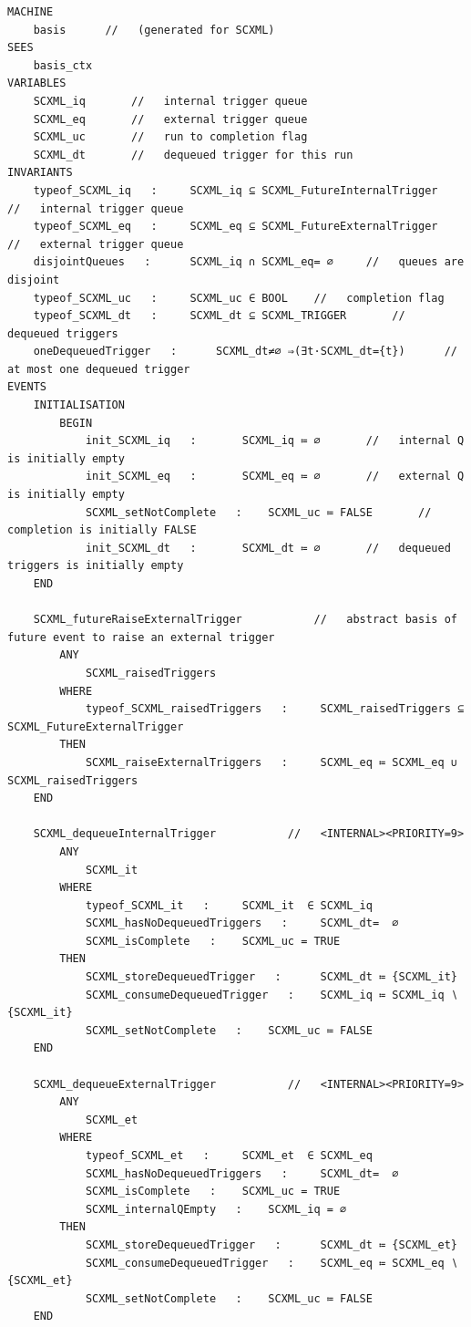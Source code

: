 \begin{lstfloat}[!tb]
\begin{lstlisting}[caption={Abstract basis machine (part of)}, label={lst:BasisMachine},language=Event-B, escapechar=|, frame=single, basicstyle=\rmfamily\scriptsize, belowskip=-2.0 \baselineskip]
MACHINE
	basis	   //   (generated for SCXML)
SEES
	basis_ctx
VARIABLES
	SCXML_iq	   //   internal trigger queue
	SCXML_eq	   //   external trigger queue
	SCXML_uc	   //   run to completion flag
	SCXML_dt	   //   dequeued trigger for this run
INVARIANTS
	typeof_SCXML_iq   :   	SCXML_iq ⊆ SCXML_FutureInternalTrigger	   //   internal trigger queue
	typeof_SCXML_eq   :   	SCXML_eq ⊆ SCXML_FutureExternalTrigger	   //   external trigger queue
	disjointQueues   :   	SCXML_iq ∩ SCXML_eq= ∅	   //   queues are disjoint
	typeof_SCXML_uc   :   	SCXML_uc ∈ BOOL	   //   completion flag
	typeof_SCXML_dt   :   	SCXML_dt ⊆ SCXML_TRIGGER	   //   dequeued triggers
	oneDequeuedTrigger   :   	SCXML_dt≠∅ ⇒(∃t·SCXML_dt={t})	   //   at most one dequeued trigger
EVENTS
	INITIALISATION      
		BEGIN
			init_SCXML_iq   :   	SCXML_iq ≔ ∅	   //   internal Q is initially empty
			init_SCXML_eq   :   	SCXML_eq ≔ ∅	   //   external Q is initially empty
			SCXML_setNotComplete   :   	SCXML_uc ≔ FALSE	   //   completion is initially FALSE
			init_SCXML_dt   :   	SCXML_dt ≔ ∅	   //   dequeued triggers is initially empty
	END

	SCXML_futureRaiseExternalTrigger      	   //   abstract basis of future event to raise an external trigger
		ANY
			SCXML_raisedTriggers
		WHERE
			typeof_SCXML_raisedTriggers   :   	SCXML_raisedTriggers ⊆ SCXML_FutureExternalTrigger
		THEN
			SCXML_raiseExternalTriggers   :   	SCXML_eq ≔ SCXML_eq ∪ SCXML_raisedTriggers
	END

	SCXML_dequeueInternalTrigger      	   //   <INTERNAL><PRIORITY=9>
		ANY
			SCXML_it
		WHERE
			typeof_SCXML_it   :   	SCXML_it  ∈ SCXML_iq
			SCXML_hasNoDequeuedTriggers   :   	SCXML_dt=  ∅
			SCXML_isComplete   :   	SCXML_uc = TRUE
		THEN
			SCXML_storeDequeuedTrigger   :   	SCXML_dt ≔ {SCXML_it}
			SCXML_consumeDequeuedTrigger   :   	SCXML_iq ≔ SCXML_iq ∖ {SCXML_it}
			SCXML_setNotComplete   :   	SCXML_uc ≔ FALSE
	END

	SCXML_dequeueExternalTrigger      	   //   <INTERNAL><PRIORITY=9>
		ANY
			SCXML_et
		WHERE
			typeof_SCXML_et   :   	SCXML_et  ∈ SCXML_eq
			SCXML_hasNoDequeuedTriggers   :   	SCXML_dt=  ∅
			SCXML_isComplete   :   	SCXML_uc = TRUE
			SCXML_internalQEmpty   :   	SCXML_iq = ∅
		THEN
			SCXML_storeDequeuedTrigger   :   	SCXML_dt ≔ {SCXML_et}
			SCXML_consumeDequeuedTrigger   :   	SCXML_eq ≔ SCXML_eq ∖ {SCXML_et}
			SCXML_setNotComplete   :   	SCXML_uc ≔ FALSE
	END


\end{lstlisting}
\end{lstfloat}
